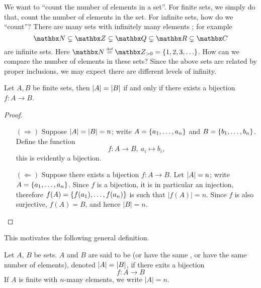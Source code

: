 \vspace*{1em}

\begin{discussion}
We want to ``count the number of elements in a set''. For finite sets, we simply do that, count the number of elements in the set. For infinite sets, how do we ``count''? There are many sets with infinitely many elements ; for example
\[\nn \subsetneq \zz \subsetneq \qq \subsetneq \rr \subsetneq \cc\]
are infinite sets. Here $\nn \defeq \zz_{>0} = \set{1,2,3,\ldots}$. How can we compare the number of elements in these sets? Since the above sets are related by proper inclusions, we may expect there are different levels of infinity.
\end{discussion}

\vspace*{1em}

\begin{lemma}
Let $A,B$ be finite sets, then $\left\lvert A\right\rvert = \left\lvert B\right\rvert$ if and only if there exists a bijection $f:A \to B$.
\end{lemma}
\begin{proof}\hfill
\begin{itemize}
\item[$(\Rightarrow)$] Suppose $\left\lvert A\right\rvert = \left\lvert B\right\rvert = n$; write $A = \left\{a_1,\ldots,a_n\right\}$ and $B = \left\{b_1,\ldots,b_n\right\}$. Define the function
\[f:A \to B,\ a_i \mapsto b_i,\]
this is evidently a bijection.

\item[$(\Leftarrow)$] Suppose there exists a bijection $f:A \to B$. Let $\left\lvert A\right\rvert = n$; write $A = \left\{a_1,\ldots,a_n\right\}$. Since $f$ is a bijection, it is in particular an injection, therefore $f(A) = \left\{f(a_1),\ldots,f(a_n)\right\}$ is such that $|f(A)| = n$. Since $f$ is also surjective, $f(A) = B$, and hence $|B| = n$. \end{itemize}
\vspace*{-\baselineskip}
\end{proof}

\vspace*{1em}

This motivates the following general definition.
\begin{definition}
Let $A,\,B$ be sets. $A$ and $B$ are said to be  (or {\color{blue}have the same }, or {\color{blue}have the same number of elements}), denoted $\left\lvert A\right\rvert = \left\lvert B\right\rvert$, if there exits a bijection
\[f:A \to B\]
If $A$ is finite with $n$-many elements, we write $|A| = n$.
\end{definition}

